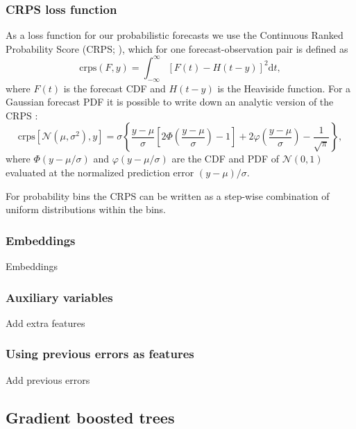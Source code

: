 \documentclass[a4paper,10pt]{scrartcl}
\begin{document}
\subsubsection{CRPS loss function}
As a loss function for our probabilistic forecasts we use the Continuous Ranked Probability Score (CRPS; \cite{???}), which for one forecast-observation pair is defined as 
\begin{equation}
 \mathrm{crps}(F, y) = \int_{-\infty}^{\infty} [F(t) - H(t-y)]^2\mathrm{d}t,
\end{equation}
where $F(t)$ is the forecast CDF and $H(t-y)$ is the Heaviside function. For a Gaussian forecast PDF it is possible to write down an analytic version of the CRPS \citep{Gneiting2005}:
\begin{equation}
 \mathrm{crps}[\mathcal{N}(\mu, \sigma^2), y] = \sigma \left\lbrace \frac{y - \mu}{\sigma} \left[ 2\Phi \left( \frac{y-\mu}{\sigma} \right) -1 \right] + 2\varphi \left(\frac{y-\mu}{\sigma} \right) - \frac{1}{\sqrt{\pi}} \right\rbrace,
\end{equation}
where $\Phi \left( y-\mu/\sigma \right)$ and $\varphi \left( y-\mu/\sigma \right)$ are the CDF and PDF of $\mathcal{N}(0, 1)$ evaluated at the normalized prediction error $(y-\mu)/\sigma$.

For probability bins the CRPS can be written as a step-wise combination of uniform distributions within the bins. 

\subsubsection{Embeddings}

Embeddings

\subsubsection{Auxiliary variables}

Add extra features

\subsubsection{Using previous errors as features}

Add previous errors

\subsection{Gradient boosted trees}
\end{document}
